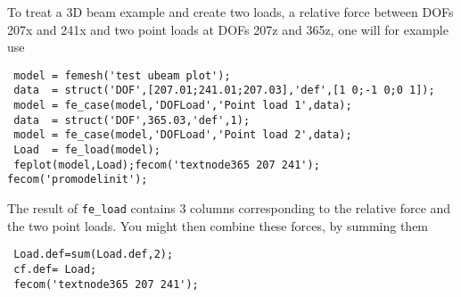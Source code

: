 To treat a 3D beam example and create two loads, a relative force between DOFs 207x and 241x and two point loads at DOFs 207z and 365z, one will for example use

\begin{verbatim}
 model = femesh('test ubeam plot');
 data  = struct('DOF',[207.01;241.01;207.03],'def',[1 0;-1 0;0 1]);
 model = fe_case(model,'DOFLoad','Point load 1',data);
 data  = struct('DOF',365.03,'def',1);
 model = fe_case(model,'DOFLoad','Point load 2',data);
 Load  = fe_load(model);
 feplot(model,Load);fecom('textnode365 207 241'); fecom('promodelinit');
\end{verbatim}%

The result of {\tt fe\_load} contains 3 columns corresponding to the relative force and the two point loads.
You might then combine these forces, by summing them

\begin{verbatim}
 Load.def=sum(Load.def,2);
 cf.def= Load; 
 fecom('textnode365 207 241');
\end{verbatim}


